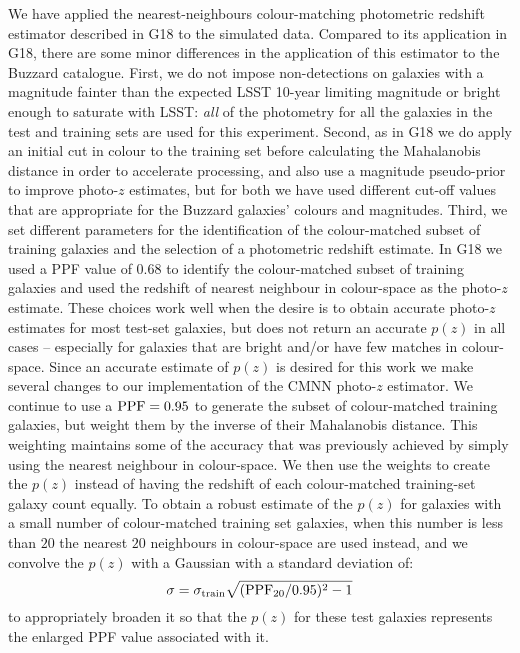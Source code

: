 We have applied the nearest-neighbours colour-matching photometric redshift estimator described in G18 to the simulated data.
Compared to its application in G18, there are some minor differences in the application of this estimator to the Buzzard catalogue.
First, we do not impose non-detections on galaxies with a magnitude fainter than the expected LSST 10-year limiting magnitude or bright enough to saturate with LSST: {\it all} of the photometry for all the galaxies in the test and training sets are used for this experiment.
Second, as in G18 we do apply an initial cut in colour to the training set before calculating the Mahalanobis distance in order to accelerate processing, and also use a magnitude pseudo-prior to improve photo-$z$ estimates, but for both we have used different cut-off values that are appropriate for the Buzzard galaxies' colours and magnitudes.
Third, we set different parameters for the identification of the colour-matched subset of training galaxies and the selection of a photometric redshift estimate.
In G18 we used a PPF value of 0.68 to identify the colour-matched subset of training galaxies and used the redshift of nearest neighbour in colour-space as the photo-$z$ estimate.
These choices work well when the desire is to obtain accurate photo-$z$ estimates for most test-set galaxies, but does not return an accurate $p(z)$ in all cases -- especially for galaxies that are bright and/or have few matches in colour-space.
Since an accurate estimate of $p(z)$ is desired for this work we make several changes to our implementation of the \textsc{CMNN} photo-$z$ estimator.
We continue to use a ${\rm PPF} = 0.95$ to generate the subset of colour-matched training galaxies, but weight them by the inverse of their Mahalanobis distance.
This weighting maintains some of the accuracy that was previously achieved by simply using the nearest neighbour in colour-space.
We then use the weights to create the $p(z)$ instead of having the redshift of each colour-matched training-set galaxy count equally.
To obtain a robust estimate of the $p(z)$ for galaxies with a small number of colour-matched training set galaxies, when this number is less than $20$ the nearest $20$ neighbours in colour-space are used instead, and we convolve the $p(z)$ with a Gaussian with a standard deviation of:
\begin{equation}
\sigma = \sigma_{\rm train} \sqrt{({\rm PPF}_{20}/0.95)^2 -1}
\end{equation}
\noindent to appropriately broaden it so that the $p(z)$ for these test galaxies represents the enlarged PPF value associated with it.
